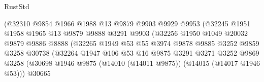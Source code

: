 \begin{lexlean}{RustStd}
\begin{coremodule}
                                    (@32310
                                      @9854
                                      @1966
                                      @1988
                                      @13
                                      @9879
                                      @9903
                                      @9929
                                      @9953
                                      (@32245
                                        @1951
                                        @1958
                                        @1965
                                        @13
                                        @9879
                                        @9888
                                        @3291
                                        @9903
                                        (@32256
                                          @1950
                                          @1049
                                          @20032
                                          @9879
                                          @9886
                                          @8888
                                          (@32265
                                            @1949
                                            @53
                                            @55
                                            @3974
                                            @9878
                                            @9885
                                            @3252
                                            @9859
                                            @3258
                                            @30738
                                            (@32264
                                              @1947
                                              @106
                                              @53
                                              @16
                                              @9875
                                              @3291
                                              @3271
                                              @3252
                                              @9869
                                              @3258
                                              (@30698
                                                @1946
                                                @9875
                                                (@14010 (@14011 @9875))
                                                (@14015 (@14017 @1946 @53)))
                                              @30665

\end{coremodule}
\end{lexlean}
